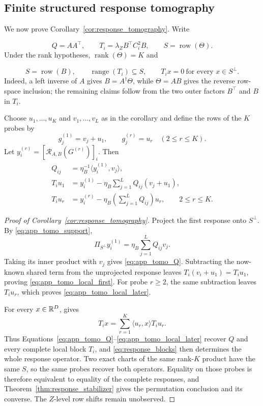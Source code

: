 \subsection{Finite structured response tomography}
\label{app:response_tomography}

We now prove Corollary~\ref{cor:response_tomography}.  Write

\[
 Q=AA^\top,
 \qquad
 T_i=\lambda_Z B^\top C_i^2B,
 \qquad
 S=\operatorname{row}(\Theta).
\]
Under the rank hypotheses, $\operatorname{rank}(\Theta)=K$ and

\begin{equation}
 S=\operatorname{row}(B),\qquad
 \operatorname{range}(T_i)\subseteq S,\qquad
 T_i x=0\ \text{for every }x\in S^\perp.
 \label{eq:app_tomo_support}
\end{equation}
Indeed, a left inverse of $A$ gives
$B=A^\dagger\Theta$, while $\Theta=AB$ gives the reverse row-space
inclusion; the remaining claims follow from the two outer factors $B^\top$
and $B$ in $T_i$.

Choose $u_1,\ldots,u_K$ and $v_1,\ldots,v_L$ as in the corollary and
define the rows of the $K$ probes by
\begin{equation}
 g_j^{(1)}=v_j+u_1,\qquad
 g_j^{(r)}=u_r\quad(2\le r\le K).
 \label{eq:app_tomo_probes}
\end{equation}
Let $y_i^{(r)}=[\mathcal R_{A,B}(G^{(r)})]_i$.  Then
\begin{align}
 Q_{ij}
 &=\eta_B^{-1}\langle y_i^{(1)},v_j\rangle,
 \label{eq:app_tomo_Q}\\
 T_i u_1
 &=y_i^{(1)}-\eta_B\sum_{j=1}^LQ_{ij}(v_j+u_1),
 \label{eq:app_tomo_local_first}\\
 T_i u_r
 &=y_i^{(r)}-\eta_B\left(\sum_{j=1}^LQ_{ij}\right)u_r,
 \qquad 2\le r\le K.
 \label{eq:app_tomo_local_later}
\end{align}

\begin{proof}[Proof of Corollary~\ref{cor:response_tomography}]
Project the first response onto $S^\perp$.  By
\eqref{eq:app_tomo_support},
\[
 \Pi_{S^\perp}y_i^{(1)}=\eta_B\sum_{j=1}^LQ_{ij}v_j.
\]
Taking its inner product with $v_j$ gives
\eqref{eq:app_tomo_Q}.  Subtracting the now-known shared term from the
unprojected response leaves
$T_i(v_i+u_1)=T_i u_1$, proving
\eqref{eq:app_tomo_local_first}.  For probe $r\ge2$, the same subtraction
leaves $T_i u_r$, which proves \eqref{eq:app_tomo_local_later}.

For every $x\in\mathbb{R}^D$,  gives
\[
 T_i x=\sum_{r=1}^K\langle u_r,x\rangle T_i u_r.
\]
Thus Equations~\ref{eq:app_tomo_Q}--\ref{eq:app_tomo_local_later} recover $Q$
and every complete local block $T_i$, and \eqref{eq:response_blocks}
then determines the whole response operator.  Two exact charts of the same
rank-$K$ product have the same $S$, so the same probes recover both
operators.  Equality on those probes is therefore equivalent to equality of
the complete responses, and Theorem~\ref{thm:response_stabilizer} gives the
permutation conclusion and its converse.  The $Z$-level row shifts remain
unobserved.
\end{proof}


